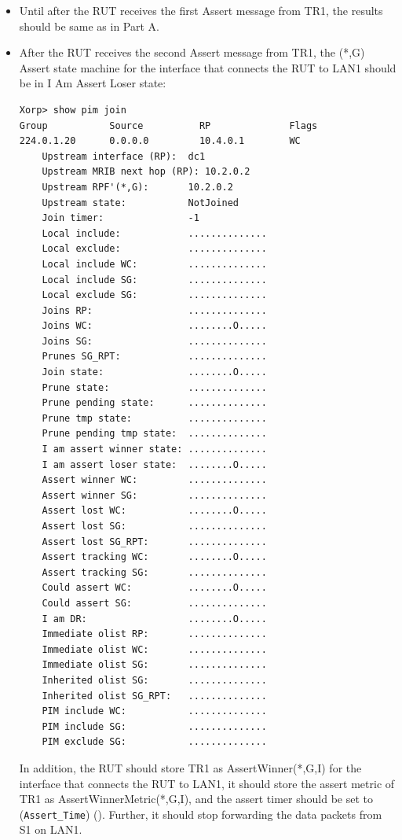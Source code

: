 \documentclass[11pt]{report}
\begin{document}
\begin{itemize}

  \item Until after the RUT receives the first Assert message from TR1, the
  results should be same as in Part A.

  \item After the RUT receives the second Assert message from TR1, the (*,G)
  Assert state machine for the interface that connects the RUT to LAN1 should
  be in I Am Assert Loser state:

\begin{verbatim}
Xorp> show pim join 
Group           Source          RP              Flags
224.0.1.20      0.0.0.0         10.4.0.1        WC   
    Upstream interface (RP):  dc1
    Upstream MRIB next hop (RP): 10.2.0.2
    Upstream RPF'(*,G):       10.2.0.2
    Upstream state:           NotJoined 
    Join timer:               -1
    Local include:            ..............
    Local exclude:            ..............
    Local include WC:         ..............
    Local include SG:         ..............
    Local exclude SG:         ..............
    Joins RP:                 ..............
    Joins WC:                 ........O.....
    Joins SG:                 ..............
    Prunes SG_RPT:            ..............
    Join state:               ........O.....
    Prune state:              ..............
    Prune pending state:      ..............
    Prune tmp state:          ..............
    Prune pending tmp state:  ..............
    I am assert winner state: ..............
    I am assert loser state:  ........O.....
    Assert winner WC:         ..............
    Assert winner SG:         ..............
    Assert lost WC:           ........O.....
    Assert lost SG:           ..............
    Assert lost SG_RPT:       ..............
    Assert tracking WC:       ........O.....
    Assert tracking SG:       ..............
    Could assert WC:          ........O.....
    Could assert SG:          ..............
    I am DR:                  ........O.....
    Immediate olist RP:       ..............
    Immediate olist WC:       ..............
    Immediate olist SG:       ..............
    Inherited olist SG:       ..............
    Inherited olist SG_RPT:   ..............
    PIM include WC:           ..............
    PIM include SG:           ..............
    PIM exclude SG:           ..............
\end{verbatim}

  In addition, the RUT should store TR1 as AssertWinner(*,G,I) for the
  interface that connects the RUT to LAN1, it should store the assert metric
  of TR1 as AssertWinnerMetric(*,G,I), and the assert timer should be set to
  (\verb=Assert_Time=) ({\PimsmAssertTime}).
  Further, it should stop forwarding the data packets from S1 on LAN1.

\end{itemize}
\end{document}
